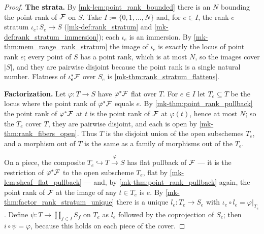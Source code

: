 \begin{proof}
  \leanok
  \textbf{The strata.}  By \ref{mk-lem:point_rank_bounded} there is an \(N\)
  bounding the point rank of \(\mathcal{F}\) on \(S\).  Take
  \(I := \{0, 1, \dots, N\}\) and, for \(e \in I\), the rank-\(e\) stratum
  \(\iota_e : S_e \to S\)
  (\ref{mk-def:rank_stratum} and \ref{mk-def:rank_stratum_immersion}); each \(\iota_e\) is
  an immersion.  By \ref{mk-thm:mem_range_rank_stratum} the image of
  \(\iota_e\) is exactly the locus of point rank \(e\); every point of
  \(S\) has a point rank, which is at most \(N\), so the images cover
  \(|S|\), and they are pairwise disjoint because the point rank is a
  single natural number.  Flatness of \(\iota_e^*\mathcal{F}\) over \(S_e\) is
  \ref{mk-thm:rank_stratum_flattens}.

  \textbf{Factorization.}  Let \(\varphi : T \to S\) have \(\varphi^*\mathcal{F}\)
  flat over \(T\).  For \(e \in I\) let \(T_e \subseteq T\) be the locus
  where the point rank of \(\varphi^*\mathcal{F}\) equals \(e\).  By
  \ref{mk-thm:point_rank_pullback} the point rank of \(\varphi^*\mathcal{F}\) at \(t\)
  is the point rank of \(\mathcal{F}\) at \(\varphi(t)\), hence at most \(N\); so
  the \(T_e\) cover \(T\), they are pairwise disjoint, and each is open by
  \ref{mk-thm:rank_fibers_open}.  Thus \(T\) is the disjoint union of the
  open subschemes \(T_e\), and a morphism out of \(T\) is the same as a
  family of morphisms out of the \(T_e\).

  On a piece, the composite
  \(T_e \hookrightarrow T \xrightarrow{\varphi} S\) has flat pullback of
  \(\mathcal{F}\) --- it is the restriction of \(\varphi^*\mathcal{F}\) to the open subscheme
  \(T_e\), flat by \ref{mk-lem:sheaf_flat_pullback} --- and, by
  \ref{mk-thm:point_rank_pullback} again, the point rank of \(\mathcal{F}\) at the
  image of any \(t \in T_e\) is \(e\).  By
  \ref{mk-thm:factor_rank_stratum_unique} there is a unique
  \(l_e : T_e \to S_e\) with \(\iota_e \circ l_e = \varphi|_{T_e}\).
  Define \(\psi : T \to \coprod_{f \in I} S_f\) on \(T_e\) as \(l_e\)
  followed by the coprojection of \(S_e\); then \(i \circ \psi = \varphi\),
  because this holds on each piece of the cover.


\end{proof}
